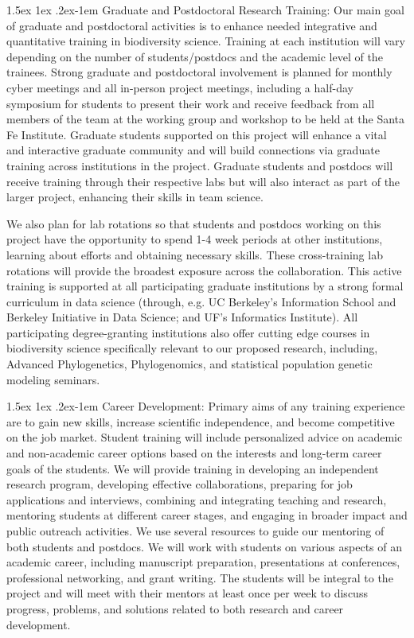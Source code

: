 \documentclass[11pt]{article}
\makeatletter
\renewcommand{\paragraph}{\@startsection{paragraph}{4}{\z@}
  {1.5ex \@plus 1ex \@minus .2ex}{-1em}
  {\normalfont\normalsize\it}
}
\makeatother
\begin{document}
\paragraph{Graduate and Postdoctoral Research Training:} Our main goal
of graduate and postdoctoral activities is to enhance needed
integrative and quantitative training in biodiversity science.
Training at each institution will vary depending on the number of
students/postdocs and the academic level of the trainees. Strong
graduate and postdoctoral involvement is planned for monthly cyber
meetings and all in-person project meetings, including a half-day
symposium for students to present their work and receive feedback from
all members of the team at the working group and workshop to be held
at the Santa Fe Institute. Graduate students supported on this project
will enhance a vital and interactive graduate community and will build
connections via graduate training across institutions in the
project. Graduate students and postdocs will receive training through
their respective labs but will also interact as part of the larger
project, enhancing their skills in team science.  

We also plan for lab rotations so that students and postdocs working
on this project have the opportunity to spend 1-4 week periods at
other institutions, learning about efforts and obtaining necessary
skills.  These cross-training lab rotations will provide the broadest
exposure across the collaboration.  This active training is supported
at all participating graduate institutions by a strong formal
curriculum in data science (through, e.g. UC Berkeley's Information
School and Berkeley Initiative in Data Science; and UF's Informatics
Institute). All participating degree-granting institutions also offer
cutting edge courses in biodiversity science specifically relevant to
our proposed research, including, Advanced Phylogenetics,
Phylogenomics, and statistical population genetic modeling seminars.

\paragraph{Career Development:} Primary aims of any training
experience are to gain new skills, increase scientific independence,
and become competitive on the job market. Student training will
include personalized advice on academic and non-academic career
options based on the interests and long-term career goals of the
students. We will provide training in developing an independent
research program, developing effective collaborations, preparing for
job applications and interviews, combining and integrating teaching
and research, mentoring students at different career stages, and
engaging in broader impact and public outreach activities. We use
several resources to guide our mentoring of both students and
postdocs. We will work with students on various aspects of an academic
career, including manuscript preparation, presentations at
conferences, professional networking, and grant writing. The students
will be integral to the project and will meet with their mentors at
least once per week to discuss progress, problems, and solutions
related to both research and career development.
\end{document}
